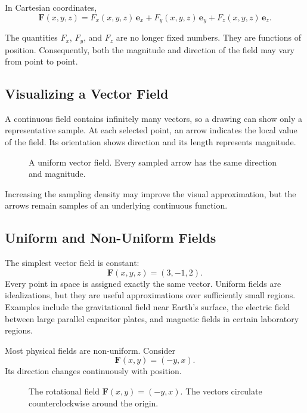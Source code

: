 In Cartesian coordinates,
\[
\boxed{
\mathbf F(x,y,z)
=
F_x(x,y,z)\,\mathbf e_x
+
F_y(x,y,z)\,\mathbf e_y
+
F_z(x,y,z)\,\mathbf e_z .
}
\]

The quantities $F_x$, $F_y$, and $F_z$ are no longer fixed numbers. They are
functions of position. Consequently, both the magnitude and direction of the
field may vary from point to point.

\subsection{Visualizing a Vector Field}

A continuous field contains infinitely many vectors, so a drawing can show only
a representative sample. At each selected point, an arrow indicates the local
value of the field. Its orientation shows direction and its length represents
magnitude.

\begin{figure}[htbp]
\centering
\begingroup
{}

\endgroup
\caption{A uniform vector field. Every sampled arrow has the same direction and
magnitude.}
\label{fig:uniform-vector-field}
\end{figure}

Increasing the sampling density may improve the visual approximation, but the
arrows remain samples of an underlying continuous function.

\subsection{Uniform and Non-Uniform Fields}

The simplest vector field is constant:
\[
\mathbf F(x,y,z)=(3,-1,2).
\]
Every point in space is assigned exactly the same vector. Uniform fields are
idealizations, but they are useful approximations over sufficiently small
regions. Examples include the gravitational field near Earth's surface, the
electric field between large parallel capacitor plates, and magnetic fields in
certain laboratory regions.

Most physical fields are non-uniform. Consider
\[
\boxed{
\mathbf F(x,y)=(-y,x).
}
\]
Its direction changes continuously with position.

\begin{figure}[htbp]
\centering
\begingroup
{}

\endgroup
\caption{The rotational field $\mathbf F(x,y)=(-y,x)$. The vectors circulate
counterclockwise around the origin.}
\label{fig:rotational-vector-field}
\end{figure}

